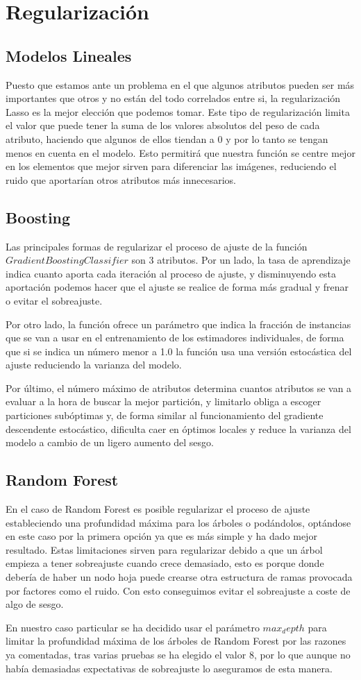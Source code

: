 \documentclass{article}
\begin{document}
	\section{Regularización}
	
	\subsection{Modelos Lineales}
	Puesto que estamos ante un problema en el que algunos atributos pueden ser más importantes que otros y no están del todo correlados entre si, la regularización Lasso es la mejor elección que podemos tomar. Este tipo de regularización limita el valor que puede tener la suma de los valores absolutos del peso de cada atributo, haciendo que algunos de ellos tiendan a 0 y por lo tanto se tengan menos en cuenta en el modelo. Esto permitirá que nuestra función se centre mejor en los elementos que mejor sirven para diferenciar las imágenes, reduciendo el ruido que aportarían otros atributos más innecesarios.
	\subsection{Boosting}
	Las principales formas de regularizar el proceso de ajuste de la función $GradientBoostingClassifier$ son 3 atributos. Por un lado, la tasa de aprendizaje indica cuanto aporta cada iteración al proceso de ajuste, y disminuyendo esta aportación podemos hacer que el ajuste se realice de forma más gradual y frenar o evitar el sobreajuste. 
	\par 
	Por otro lado, la función ofrece un parámetro que indica la fracción de instancias que se van a usar en el entrenamiento de los estimadores individuales, de forma que si se indica un número menor a 1.0 la función usa una versión estocástica del ajuste reduciendo la varianza del modelo.
	\par 
	Por último, el número máximo de atributos determina cuantos atributos se van a evaluar a la hora de buscar la mejor partición, y limitarlo obliga a escoger particiones subóptimas y, de forma similar al funcionamiento del gradiente descendente estocástico, dificulta caer en óptimos locales y reduce la varianza del modelo a cambio de un ligero aumento del sesgo.
	\subsection{Random Forest}
	En el caso de Random Forest es posible regularizar el proceso de ajuste estableciendo una profundidad máxima para los árboles o podándolos, optándose en este caso por la primera opción ya que es más simple y ha dado mejor resultado. Estas limitaciones sirven para regularizar debido a que un árbol empieza a tener sobreajuste cuando crece demasiado, esto es porque donde debería de haber un nodo hoja puede crearse otra estructura de ramas provocada por factores como el ruido. Con esto conseguimos evitar el sobreajuste a coste de algo de sesgo.
	\par
	En nuestro caso particular se ha decidido usar el parámetro $max_depth$ para limitar la profundidad máxima de los árboles de Random Forest por las razones ya comentadas, tras varias pruebas se ha elegido el valor 8, por lo que aunque no había demasiadas expectativas de sobreajuste lo aseguramos de esta manera.
\end{document}
